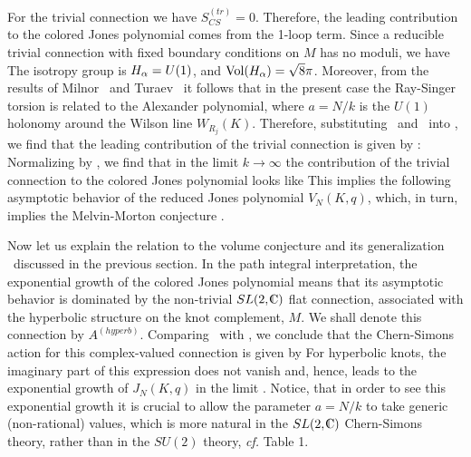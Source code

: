 For the trivial connection we have $S_{CS}^{(tr)}=0$. Therefore,
the leading contribution to the colored Jones polynomial
comes from the 1-loop term. Since a reducible trivial connection
with fixed boundary conditions on $M$ has no moduli, we have
%
\eqn{}
%
The isotropy group is $H_{\alpha} = U(1)$, and ${\rm Vol} (H_{\alpha}) = \sqrt{8} \pi$.
Moreover, from the results of Milnor \Milnortors\ and Turaev \Turaevtors\
it follows that in the present case
the Ray-Singer torsion is related to the Alexander polynomial,
%
\eqn{}
%
where $a=N/k$ is the $U(1)$ holonomy around the Wilson line $W_{R_j} (K)$.
Therefore, substituting \htrivial\ and \milnorturaev\ into
\sconeloop, we find that the leading contribution
of the trivial connection is given by \Rozansky:
%
\eqn{}
%
Normalizing by \zforsphere, we find that in the limit $k \to \infty$
the contribution of the trivial connection to the colored Jones
polynomial looks like
%
\eqn{}
%
This implies the following asymptotic behavior of the reduced Jones
polynomial $V_N (K,q)$,
%
\eqn{}
%
which, in turn, implies the Melvin-Morton conjecture \mmconj.



Now let us explain the relation to the volume conjecture and
its generalization \generalconj\ discussed in the previous section.
In the path integral interpretation, the exponential growth
of the colored Jones polynomial means that its asymptotic
behavior is dominated by the non-trivial $SL(2,\IC)$ flat connection,
associated with the hyperbolic structure on the knot complement, $M$.
We shall denote this connection by $A^{(hyperb)}$.
Comparing \generalconj\ with \zcseries, we conclude that
the Chern-Simons action for this complex-valued connection
is given by
%
\eqn{}
%
For hyperbolic knots, the imaginary part of this expression
does not vanish and, hence, leads to the exponential
growth of $J_N (K,q)$ in the limit \thelimit.
Notice, that in order to see this exponential growth it is crucial
to allow the parameter $a=N/k$ to take generic (non-rational) values,
which is more natural in the $SL(2,\IC)$ Chern-Simons theory,
rather than in the $SU(2)$ theory, {\it cf.} Table 1.

